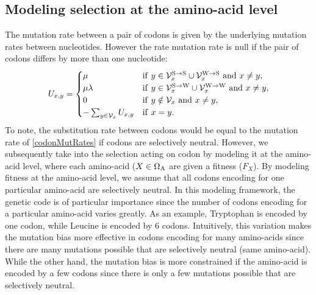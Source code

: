 \subsection{Modeling selection at the amino-acid level}
The mutation rate between a pair of \glspl{codon} is given by the underlying mutation rates between nucleotides.
However the rate mutation rate is null if the pair of \glspl{codon} differs by more than one nucleotide:
\begin{equation}
\label{codonMutRates}
U_{x, y} =
\begin{cases}
\mu
& \mathrm{if} \ y \in  \mathcal{V}_x^{\mathrm{S} \rightarrow \mathrm{S}} \cup \mathcal{V}_x^{\mathrm{W} \rightarrow \mathrm{S}} \ \mathrm{ and } \ x \neq y, \\
\mu \lambda
& \mathrm{if} \ y \in \mathcal{V}_x^{\mathrm{S} \rightarrow \mathrm{W}} \cup \mathcal{V}_x^{\mathrm{W} \rightarrow \mathrm{W}}   \ \mathrm{ and } \ x \neq y, \\
0
& \mathrm{if} \  y \notin \mathcal{V}_x \ \mathrm{ and } \ x \neq y, \\
- \sum_{y \in \mathcal{V}_x }  U_{x, y} & \mathrm{if} \ x = y.
\end{cases}
\end{equation}
To note, the \gls{substitution} rate between \glspl{codon} would be equal to the mutation rate of \ref{codonMutRates} if \glspl{codon} are selectively \gls{neutral}.
However, we subsequently take into the selection acting on \gls{codon} by modeling it at the amino-acid level, where each amino-acid ($X \in \Omega_{\mathrm{A}}$ are given a fitness ($F_X$).
By modeling fitness at the amino-acid level, we assume that all \glspl{codon} encoding for one particular amino-acid are selectively \gls{neutral}.
In this modeling framework, the genetic code is of particular importance since the number of \glspl{codon} encoding for a particular amino-acid varies greatly.
As an example, Tryptophan is encoded by one \gls{codon}, while Leucine is encoded by 6 \glspl{codon}.
Intuitively, this variation makes the mutation bias more effective in \glspl{codon} encoding for many amino-acids since there are many mutations possible that are selectively \gls{neutral} (same amino-acid).
While the other hand, the mutation bias is more constrained if the amino-acid is encoded by a few \glspl{codon} since there is only a few mutations possible that are selectively \gls{neutral}.\\

